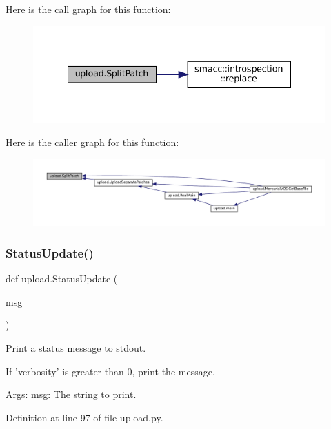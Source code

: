 Here is the call graph for this function\+:
\nopagebreak
\begin{figure}[H]
\begin{center}
\leavevmode
\includegraphics[width=335pt]{namespaceupload_a9dd260785ca4cc97e245234811ef1949_cgraph}
\end{center}
\end{figure}
Here is the caller graph for this function\+:
\nopagebreak
\begin{figure}[H]
\begin{center}
\leavevmode
\includegraphics[width=350pt]{namespaceupload_a9dd260785ca4cc97e245234811ef1949_icgraph}
\end{center}
\end{figure}
\mbox{\label{namespaceupload_a79ce84c196c018f3b0c7ff7a9b626b58}} 
\subsubsection{\texorpdfstring{Status\+Update()}{StatusUpdate()}}
{\footnotesize\ttfamily def upload.\+Status\+Update (\begin{DoxyParamCaption}\item[{}]{msg }\end{DoxyParamCaption})}

\begin{DoxyVerb}Print a status message to stdout.

If 'verbosity' is greater than 0, print the message.

Args:
  msg: The string to print.
\end{DoxyVerb}
 

Definition at line 97 of file upload.\+py.



